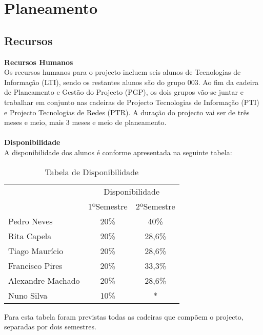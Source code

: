 \documentclass[12pt, a4paper, twoside]{report} %
\begin{document}
\chapter{Planeamento}

\section{Recursos}

\textbf{Recursos Humanos}
\\

Os recursos humanos para o projecto incluem seis alunos de Tecnologias de Informação (LTI), sendo os restantes alunos são do grupo 003.
Ao fim da cadeira de Planeamento e Gestão do Projecto (PGP), os dois grupos vão-se juntar e trabalhar em conjunto nas cadeiras de Projecto Tecnologias de Informação (PTI) e Projecto Tecnologias de Redes (PTR). A duração do projecto vai ser de três meses e meio, mais 3 meses e meio de planeamento. 
\\
\\
\textbf{Disponibilidade}
\\

A disponibilidade dos alunos é conforme apresentada na seguinte tabela:

\begin{table}[h]
\centering
\begin{tabular}{|l|c c|}
\hline
\multirow{2}{*}{} & \multicolumn{2}{c|}{Disponibilidade} \\ \cline{2-3} 
                  & 1ºSemestre        & 2ºSemestre       \\ \hline
Pedro Neves       & 20\%              & 40\%             \\ \hline
Rita Capela       & 20\%              & 28,6\%           \\ \hline
Tiago Maurício    & 20\%              & 28,6\%           \\ \hline
Francisco Pires   & 20\%              & 33,3\%           \\ \hline
Alexandre Machado & 20\%              & 28,6\%           \\ \hline
Nuno Silva        & 10\%              & *                \\ \hline
\end{tabular}
\caption{Tabela de Disponibilidade}
\label{disponibilidade}
\end{table}

Para esta tabela foram previstas todas as cadeiras que compõem o projecto, separadas por dois semestres. 
\clearpage
\end{document}
